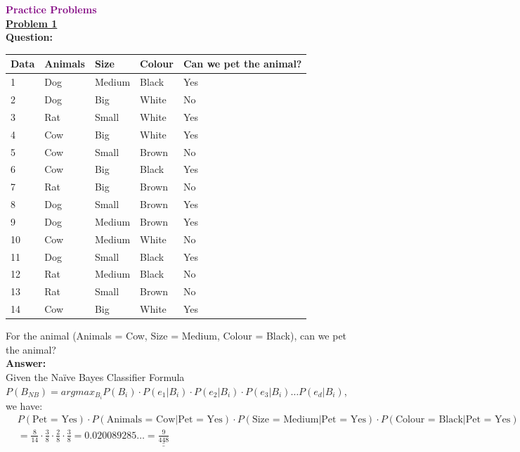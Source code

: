 \documentclass{book}
\begin{document}
\newpage
\textbf{\textcolor{purple}{\Large{Practice Problems}}}\\
\vspace{1mm}
\underline{\textbf{Problem 1}}\\
\textbf{Question:}
\begin{center}
    \begin{tabular}{|m{1cm}|m{2cm}|m{1.5cm}|m{1.5cm}|m{4cm}|}
        \hline
        \rowcolor{lightblue}
        \textbf{Data} & \textbf{Animals} & \textbf{Size} & \textbf{Colour} & \textbf{Can we pet the animal?} \\
        \hline
        1 & Dog & Medium & Black & Yes \\
        \hline
        2 & Dog & Big & White & No \\
        \hline
        3 & Rat & Small & White & Yes \\
        \hline
        4 & Cow & Big & White & Yes \\
        \hline
        5 & Cow & Small & Brown & No \\
        \hline
        6 & Cow & Big & Black & Yes \\
        \hline
        7 & Rat & Big & Brown & No \\
        \hline
        8 & Dog & Small & Brown & Yes \\
        \hline
        9 & Dog & Medium & Brown & Yes \\
        \hline
        10 & Cow & Medium & White & No \\
        \hline
        11 & Dog & Small & Black & Yes \\
        \hline
        12 & Rat & Medium & Black & No \\
        \hline
        13 & Rat & Small & Brown & No \\
        \hline
        14 & Cow & Big & White & Yes \\
        \hline
    \end{tabular}
\end{center}
For the animal (Animals = Cow, Size = Medium, Colour = Black), can we pet the animal?\\
\vspace{2mm}
\textbf{Answer:}\\
Given the Naïve Bayes Classifier Formula \(P(B_{NB}) = argmax_{B_i} P(B_i) \cdot P(e_1|B_i) \cdot P(e_2|B_i) \cdot P(e_3|B_i) \ldots P(e_d|B_i)\), we have:
\begin{align*}
    & P({\text{Pet = Yes}}) \cdot P({\text{Animals = Cow}}|{\text{Pet = Yes}}) \cdot P({\text{Size = Medium}}|{\text{Pet = Yes}}) \cdot P({\text{Colour = Black}}|{\text{Pet = Yes}}) \\
    & = \frac{8}{14} \cdot \frac{3}{8} \cdot \frac{2}{8} \cdot \frac{3}{8} = 0.020089285\ldots = \underline{\underline{\frac{9}{448}}}
\end{align*}
\end{document}

